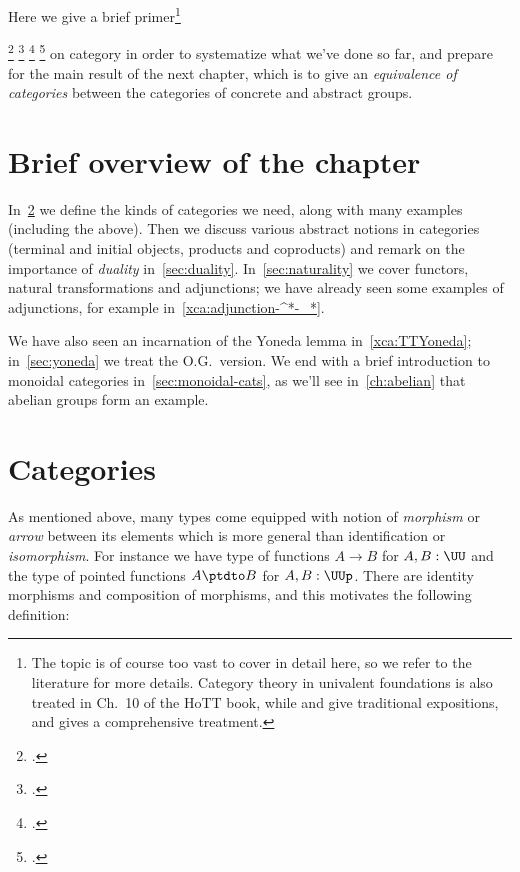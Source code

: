 Here we give a brief primer\footnote{%
  The topic is of course too vast to cover in detail here,
  so we refer to the literature for more details.
  Category theory in univalent foundations is also treated in
  Ch.~10 of the HoTT book\footnotemark{},
  while \citeauthor{AwodeyCat}\footnotemark{}
  and \citeauthor{RiehlContext}\footnotemark{}
  give traditional expositions,
  and \citeauthor{MacLaneWorking}\footnotemark{}
  gives a comprehensive treatment.}%
\addtocounter{footnote}{-3}\footcitetext{hottbook}%
\footcitetext{AwodeyCat}%
\footcitetext{RiehlContext}%
\footcitetext{MacLaneWorking}%
on category in order to systematize what we've done so far,
and prepare for the main result of the next chapter, which is to give an
\emph{equivalence of categories} between the categories of concrete and abstract groups.

\section{Brief overview of the chapter}

In~\cref{sec:categories} we define the kinds of categories we need, along with many examples (including the above).
Then we discuss various abstract notions in categories (terminal and initial objects, products and coproducts)
and remark on the importance of \emph{duality} in~\cref{sec:duality}.
In~\cref{sec:naturality} we cover functors, natural transformations and adjunctions; we have already seen some examples of adjunctions, for example in~\cref{xca:adjunction-^*-_*}.

We have also seen an incarnation of the Yoneda lemma in~\cref{xca:TTYoneda};
in~\cref{sec:yoneda} we treat the O.G.\ version. We end with a brief introduction to monoidal categories in~\cref{sec:monoidal-cats}, as we'll see in~\cref{ch:abelian} that abelian groups form an example.

\section{Categories}
\label{sec:categories}

As mentioned above, many types come equipped with notion
of \emph{morphism} or \emph{arrow} between its elements
which is more general than identification or \emph{isomorphism}.
For instance
we have type of functions $A \to B$ for $A,B:\UU$
and the type of pointed functions $A \ptdto B$ for $A,B:\UUp$.
There are identity morphisms and composition of morphisms,
and this motivates the following definition:

